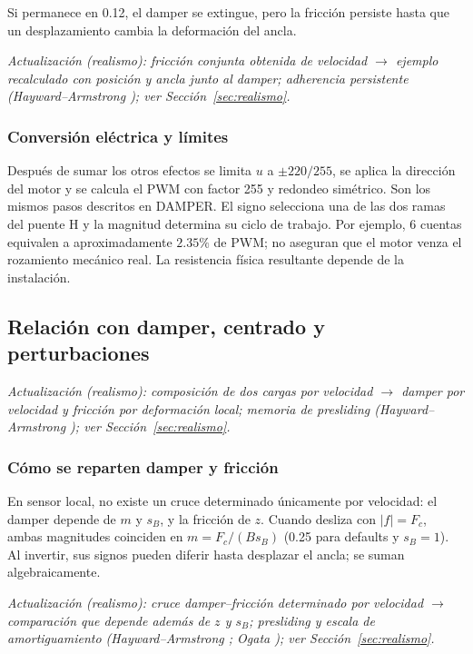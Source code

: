Si permanece en 0.12, el damper se extingue, pero la fricción persiste hasta que un desplazamiento cambia la deformación del ancla.

\textit{Actualización (realismo): fricción conjunta obtenida de velocidad $\rightarrow$ ejemplo recalculado con posición y ancla junto al damper; adherencia persistente (Hayward--Armstrong \cite{hayward2000}); ver Sección~\ref{sec:realismo}.}

\subsubsection{Conversión eléctrica y límites}
Después de sumar los otros efectos se limita $u$ a $\pm220/255$, se aplica la dirección del motor y se calcula el PWM con factor 255 y redondeo simétrico. Son los mismos pasos descritos en DAMPER. El signo selecciona una de las dos ramas del puente H y la magnitud determina su ciclo de trabajo. Por ejemplo, 6 cuentas equivalen a aproximadamente $2.35\%$ de PWM; no aseguran que el motor venza el rozamiento mecánico real. La resistencia física resultante depende de la instalación.

\subsection{Relación con damper, centrado y perturbaciones}

\textit{Actualización (realismo): composición de dos cargas por velocidad $\rightarrow$ damper por velocidad y fricción por deformación local; memoria de presliding (Hayward--Armstrong \cite{hayward2000}); ver Sección~\ref{sec:realismo}.}

\subsubsection{Cómo se reparten damper y fricción}
En sensor local, no existe un cruce determinado únicamente por velocidad: el damper depende de $m$ y $s_B$, y la fricción de $z$. Cuando desliza con $|f|=F_c$, ambas magnitudes coinciden en $m=F_c/(Bs_B)$ (0.25 para defaults y $s_B=1$). Al invertir, sus signos pueden diferir hasta desplazar el ancla; se suman algebraicamente.

\textit{Actualización (realismo): cruce damper--fricción determinado por velocidad $\rightarrow$ comparación que depende además de $z$ y $s_B$; presliding y escala de amortiguamiento (Hayward--Armstrong \cite{hayward2000}; Ogata \cite{ogata}); ver Sección~\ref{sec:realismo}.}

